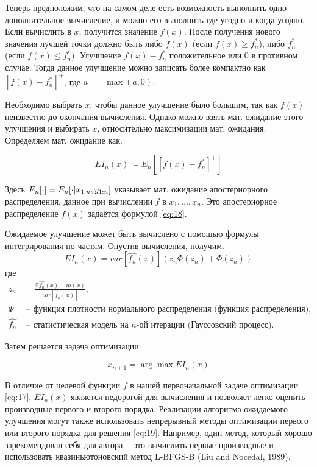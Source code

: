 Теперь предположим, что на самом деле есть возможность выполнить одно дополнительное вычисление, и можно его выполнить где угодно и когда угодно. Если вычислить в $x$, получится значение $f(x)$. После получения нового значения лучшей точки должно быть либо $f(x)$ (если $f(x) \geq f_n^*$), либо $f_n^*$ (если $f(x) \leq f_n^*$). Улучшение $f(x) - f_n^*$ положительное или 0 в противном случае. Тогда данное улучшение можно записать более компактно как $[f(x) - f_n^*]^+$, где $a^+ = \max(a, 0)$. 

Необходимо выбрать $x$, чтобы данное улучшение было большим, так как $f(x)$ неизвестно до окончания вычисления. Однако можно взять мат. ожидание этого улучшения и выбирать $x$, относительно максимизации мат. ожидания. Определяем мат. ожидание как.

$$
 EI_n(x) \coloneqq E_n [[f(x) - f_n^*]^+]
$$

Здесь $E_n[\cdot] = E_n[\cdot \arrowvert x_{1:n}, y_{1:n}]$ указывает мат. ожидание апостериорного распределения, данное при вычислении $f$ в $x_1 , \dots, x_n$. Это апостериорное распределение $f(x)$ задаётся формулой \eqref{eq:18}. 

Ожидаемое улучшение может быть вычислено с помощью формулы интегрирования по частям. Опустив вычисления, получим.
$$
 EI_n(x) = var[\hat{f_n}(x)] (z_n \Phi(z_n) + \Phi(z_n))
$$
где 
\begin{align*}
 z_n &= \frac{\mathbb{E} \hat{f_n}(x)-m(x)}{var[\hat{f_n}(x)]}, \\
 \Phi & \text{ -- функция плотности нормального распределения (функция распределения), } \\
 \hat{f_n} & \text{ -- статистическая модель на $n$-ой итерации (Гауссовский процесс).}
\end{align*}

Затем решается задача оптимизации:

\begin{equation} \label{eq:19}
 x_{n+1} =  \arg\!\max EI_n (x)
\end{equation}

В отличие от целевой функции $f$ в нашей первоначальной задаче оптимизации \eqref{eq:17}, $EI_n(x)$ является недорогой для вычисления и позволяет легко оценить производные первого и второго порядка. Реализации алгоритма ожидаемого улучшения могут также использовать непрерывный методы  оптимизации первого или второго порядка для решения \eqref{eq:19}. Например, один метод, который хорошо зарекомендовал себя для автора, - это вычислить первые производные и использовать квазиньютоновский метод L-BFGS-B (Liu and Nocedal, 1989).

